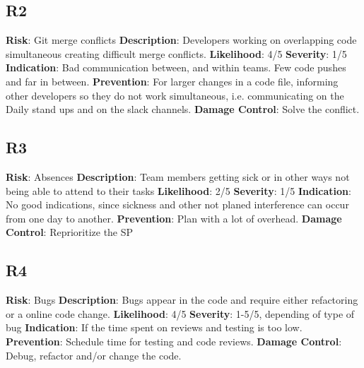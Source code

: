 \documentclass{article}
\begin{document}
\subsection{R2}
\textbf{Risk}: Git merge conflicts \newline
\textbf{Description}: Developers working on overlapping code simultaneous creating difficult merge conflicts.  \newline
\textbf{Likelihood}: 4/5\newline
\textbf{Severity}: 1/5\newline
\textbf{Indication}: Bad communication between, and within teams. Few code pushes and far in between. \newline
\textbf{Prevention}: For larger changes in a code file, informing other developers so they do not work simultaneous, i.e. communicating on the Daily stand ups and on the slack channels. \newline
\textbf{Damage Control}: Solve the conflict. \newline

\subsection{R3}
\textbf{Risk}: Absences \newline
\textbf{Description}: Team members getting sick or in other ways not being able to attend to their tasks \newline
\textbf{Likelihood}: 2/5\newline
\textbf{Severity}: 1/5\newline
\textbf{Indication}: No good indications, since sickness and other not planed interference can occur from one day to another. \newline
\textbf{Prevention}: Plan with a lot of overhead. \newline
\textbf{Damage Control}: Reprioritize the SP \newline

\subsection{R4}
\textbf{Risk}: Bugs \newline
\textbf{Description}: Bugs appear in the code and require either refactoring or a online code change. \newline
\textbf{Likelihood}: 4/5\newline
\textbf{Severity}: 1-5/5, depending of type of bug \newline
\textbf{Indication}: If the time spent on reviews and testing is too low.\newline
\textbf{Prevention}: Schedule time for testing and code reviews. \newline
\textbf{Damage Control}: Debug, refactor and/or change the code. \newline
\end{document}
